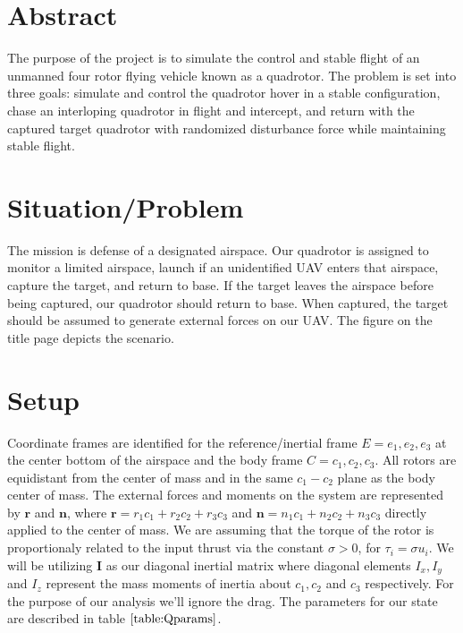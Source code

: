 \documentclass{article}
\begin{document}
\begin{multicols}{2}


\section*{Abstract}

The purpose of the project is to simulate the control and stable flight of an unmanned four rotor flying vehicle known as a quadrotor.  The problem is set into three goals: simulate and control the quadrotor hover in a stable configuration, chase an interloping quadrotor in flight and intercept, and return with the captured target quadrotor with randomized disturbance force while maintaining stable flight.

\section*{Situation/Problem}
The mission is defense of a designated airspace.  Our quadrotor is assigned to monitor a limited airspace, launch if an unidentified UAV enters that airspace, capture the target, and return to base.  If the target leaves the airspace before being captured, our quadrotor should return to base.  When captured, the target should be assumed to generate external forces on our UAV. The figure on the title page depicts the scenario.


\section*{Setup}

\noindent Coordinate frames are identified for the reference/inertial frame $E={e_1, e_2, e_3}$ at the center bottom of the airspace and the body frame $C={c_1, c_2, c_3}$.  All rotors are equidistant from the center of mass and in the same $c_1-c_2 $ plane as the body center of mass.  The external forces and moments on the system are represented by $\boldsymbol{r}$ and $\boldsymbol{n}$, where $\boldsymbol{r} = r_1 c_1 + r_2 c_2 + r_3 c_3$ and $\boldsymbol{n} = n_1 c_1 + n_2 c_2 + n_3 c_3$ directly applied to the center of mass. We are assuming that the torque of the rotor is proportionaly related to the input thrust via the constant $\sigma>0$, for $\tau_i = \sigma u_i$. We will be utilizing $\boldsymbol{I}$ as our diagonal inertial matrix where diagonal elements  $I_x, I_y $ and $I_z$ represent the mass moments of inertia about $c_1, c_2 $ and $c_3$ respectively.  For the purpose of our analysis we'll ignore the drag. The parameters for our state are described in table $\ref{table:Qparams}$.



\end{multicols}
\end{document}
